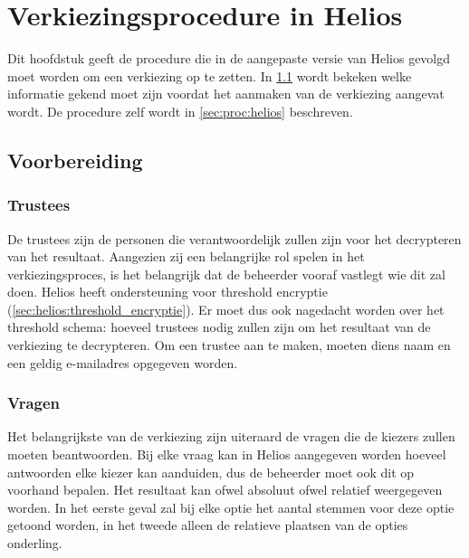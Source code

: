 %
%

\chapter{Verkiezingsprocedure in Helios}
\label{chap:procedure}

Dit hoofdstuk geeft de procedure die in de aangepaste versie van Helios gevolgd moet worden om een verkiezing op te zetten. In \ref{sec:proc:voorbereiding} wordt bekeken welke informatie gekend moet zijn voordat het aanmaken van de verkiezing aangevat wordt. De procedure zelf wordt in \ref{sec:proc:helios} beschreven.

\section{Voorbereiding}
\label{sec:proc:voorbereiding}

\subsection{Trustees}

De trustees zijn de personen die verantwoordelijk zullen zijn voor het decrypteren van het resultaat. Aangezien zij een belangrijke rol spelen in het verkiezingsproces, is het belangrijk dat de beheerder vooraf vastlegt wie dit zal doen. Helios heeft ondersteuning voor threshold encryptie (\ref{sec:helios:threshold_encryptie}). Er moet dus ook nagedacht worden over het threshold schema: hoeveel trustees nodig zullen zijn om het resultaat van de verkiezing te decrypteren. Om een trustee aan te maken, moeten diens naam en een geldig e-mailadres opgegeven worden.

\subsection{Vragen}
\label{sec:proc:voorbereiding:vragen}

Het belangrijkste van de verkiezing zijn uiteraard de vragen die de kiezers zullen moeten beantwoorden. Bij elke vraag kan in Helios aangegeven worden hoeveel antwoorden elke kiezer kan aanduiden, dus de beheerder moet ook dit op voorhand bepalen. Het resultaat kan ofwel absoluut ofwel relatief weergegeven worden. In het eerste geval zal bij elke optie het aantal stemmen voor deze optie getoond worden, in het tweede alleen de relatieve plaatsen van de opties onderling.

